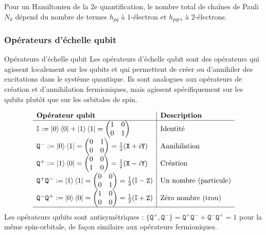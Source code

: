 \documentclass[12pt,a4paper,svgnames,x11names,rgb,table]{article} %
\numberwithin{equation}{section} %
\numberwithin{figure}{section} %
\numberwithin{table}{section} %
\begin{document}
Pour un Hamiltonien de la 2e quantification, le nombre total de chaînes de Pauli $N_k$ dépend du nombre de termes $h_{pq}$ à 1-électron et $h_{pqrs}$ à 2-électrons.

\subsubsection{Opérateurs d'échelle qubit}

\begin{definition}{Opérateurs d'échelle qubit}{}
Les opérateurs d'échelle qubit sont des opérateurs qui agissent localement sur les qubits et qui permettent de créer ou d'annihiler des excitations dans le système quantique. Ils sont analogues aux opérateurs de création et d'annihilation fermioniques, mais agissent spécifiquement sur les qubits plutôt que sur les orbitales de spin.
\end{definition}
$$
\begin{array}{l|l}
\textbf{Opérateur qubit} & \textbf{Description} \\ \hline
\mathbb{I} := \ket{0}\bra{0} + \ket{1}\bra{1} = \begin{pmatrix} 1 & 0 \\ 0 & 1 \end{pmatrix} & \text{Identité} \\
\mathtt{Q}^- := \ket{0}\bra{1} = \begin{pmatrix} 0 & 1 \\ 0 & 0 \end{pmatrix} = \frac12(\mathtt{X} + i\mathtt{Y}) & \text{Annihilation} \\
\mathtt{Q}^+ := \ket{1}\bra{0} = \begin{pmatrix} 0 & 0 \\ 1 & 0 \end{pmatrix} = \frac12(\mathtt{X} - i\mathtt{Y}) & \text{Création} \\
\mathtt{Q}^+ \mathtt{Q}^- := \ket{1}\bra{1} = \begin{pmatrix} 0 & 0 \\ 0 & 1 \end{pmatrix} = \frac12(\mathbb{I} - \mathtt{Z}) & \text{Un nombre (particule)} \\
\mathtt{Q}^- \mathtt{Q}^+ := \ket{0}\bra{0} = \begin{pmatrix} 1 & 0 \\ 0 & 0 \end{pmatrix} = \frac12(\mathbb{I} + \mathtt{Z}) & \text{Zéro nombre (trou)} \\ \hline
\end{array}
$$
Les opérateurs qubits sont antisymétriques : $\{\mathtt{Q}^+, \mathtt{Q}^-\} = \mathtt{Q}^+ \mathtt{Q}^- + \mathtt{Q}^- \mathtt{Q}^+ = 1$ pour la même spin-orbitale, de façon similaire aux opérateurs fermioniques.
\end{document}
